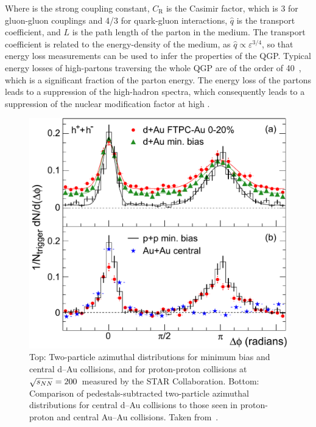 Where \als is the strong coupling constant, $C_\mathrm{R}$ is the Casimir factor, which is 3 for gluon-gluon couplings and 4/3 for quark-gluon interactions, $\hat{q}$ is the transport coefficient, and $L$ is the path length of the parton in the medium. The transport coefficient is related to the energy-density of the medium, as $\hat{q} \propto \varepsilon^{3/4}$, so that energy loss measurements can be used to infer the properties of the QGP. Typical energy losses of high-\pt partons traversing the whole QGP are of the order of 40~\gev, which is a significant fraction of the parton energy. The energy loss of the partons leads to a suppression of the high-\pt hadron spectra, which consequently leads to a suppression of the nuclear modification factor at high \pt. 

\begin{figure}[htb]
  \centering
  \includegraphics[width=0.7\linewidth]{Figures/Chapter 1/dAu_Fig4.pdf}
  \caption{Top: Two-particle azimuthal distributions for minimum bias and central d--Au collisions, and for proton-proton collisions at $\sqrt{s_{NN}} = 200$~\gev measured by the STAR Collaboration. Bottom: Comparison of pedestals-subtracted two-particle azimuthal distributions for central d--Au collisions to those seen in proton-proton and central Au--Au collisions. Taken from~\cite{STAR:2003pjh}.}
  \label{fig:azimuthal_correlations}
\end{figure}

